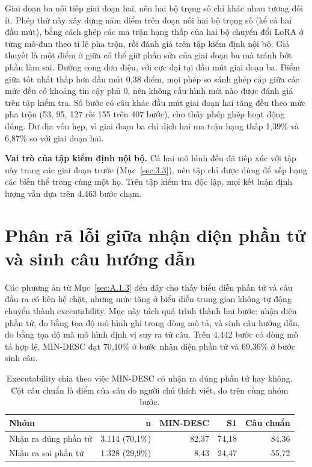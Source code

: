 Giai đoạn ba nối tiếp giai đoạn hai, nên hai bộ trọng số chỉ khác nhau tương đối ít. Phép thử này xây dựng năm điểm trên đoạn nối hai bộ trọng số (kể cả hai đầu mút), bằng cách ghép các ma trận hạng thấp của hai bộ chuyển đổi LoRA ở từng mô-đun theo tỉ lệ pha trộn, rồi đánh giá trên tập kiểm định nội bộ. Giả thuyết là một điểm ở giữa có thể giữ phần sửa của giai đoạn ba mà tránh bớt phần làm sai. Đường cong đơn điệu, với cực đại tại đầu mút giai đoạn ba. Điểm giữa tốt nhất thấp hơn đầu mút 0,38 điểm, mọi phép so sánh ghép cặp giữa các mức đều có khoảng tin cậy phủ 0, nên không cấu hình mới nào được đánh giá trên tập kiểm tra. Số bước có câu khác đầu mút giai đoạn hai tăng đều theo mức pha trộn (53, 95, 127 rồi 155 trên 407 bước), cho thấy phép ghép hoạt động đúng. Dư địa vốn hẹp, vì giai đoạn ba chỉ dịch hai ma trận hạng thấp 1,39\% và 6,87\% so với giai đoạn hai.

\textbf{Vai trò của tập kiểm định nội bộ.} Cả hai mô hình đều đã tiếp xúc với tập này trong các giai đoạn trước (Mục~\ref{sec:3.3}), nên tập chỉ được dùng để xếp hạng các biến thể trong cùng một họ. Trên tập kiểm tra độc lập, mọi kết luận định lượng vẫn dựa trên 4.463 bước chạm.

\section{Phân rã lỗi giữa nhận diện phần tử và sinh câu hướng dẫn}\label{sec:A.5}

Các phương án từ Mục~\ref{sec:A.1.3} đến đây cho thấy biểu diễn phần tử và câu đầu ra có liên hệ chặt, nhưng mức tăng ở biểu diễn trung gian không tự động chuyển thành executability. Mục này tách quá trình thành hai bước: nhận diện phần tử, đo bằng tọa độ mô hình ghi trong dòng mô tả, và sinh câu hướng dẫn, đo bằng tọa độ mà mô hình định vị suy ra từ câu. Trên 4.442 bước có dòng mô tả hợp lệ, MIN-DESC đạt 70,10\% ở bước nhận diện phần tử và 69,36\% ở bước sinh câu.

\begin{table}[htbp]
\centering\small
\caption[Executability chia theo việc MIN-DESC có nhận ra đúng phần tử hay không.]{Executability chia theo việc MIN-DESC có nhận ra đúng phần tử hay không. Cột câu chuẩn là điểm của câu do người chú thích viết, đo trên cùng nhóm bước.}\label{tab:A.11}
\begin{tabular}{@{}lrrrr@{}}
\toprule
\textbf{Nhóm} & \textbf{n} & \textbf{MIN-DESC} & \textbf{S1} & \textbf{Câu chuẩn} \\
\midrule
Nhận ra đúng phần tử & 3.114 (70,1\%) & 82,37 & 74,18 & 84,36 \\
Nhận ra sai phần tử & 1.328 (29,9\%) & 8,43 & 24,47 & 55,72 \\
\bottomrule
\end{tabular}
\end{table}

